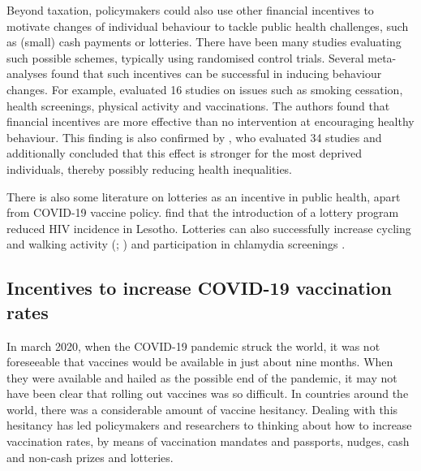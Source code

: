 \documentclass{scrbook}
\begin{document}
Beyond taxation, policymakers could also use other financial incentives
to motivate changes of individual behaviour to tackle public health
challenges, such as (small) cash payments or lotteries. There have been
many studies evaluating such possible schemes, typically using
randomised control trials. Several meta-analyses found that such
incentives can be successful in inducing behaviour changes. For example,
\textcite{giles_effectiveness_2014} evaluated 16 studies on issues such
as smoking cessation, health screenings, physical activity and
vaccinations. The authors found that financial incentives are more
effective than no intervention at encouraging healthy behaviour. This
finding is also confirmed by \textcite{mantzari_personal_2015}, who
evaluated 34 studies and additionally concluded that this effect is
stronger for the most deprived individuals, thereby possibly reducing
health inequalities.

There is also some literature on lotteries as an incentive in public
health, apart from COVID-19 vaccine policy.
\textcite{bjorkman_nyqvist_incentivizing_2018} find that the
introduction of a lottery program reduced HIV incidence in Lesotho.
Lotteries can also successfully increase cycling and walking activity
(\cite{ciccone_using_2021}; \cite{patel_randomized_2018}) and
participation in chlamydia screenings \parencite{niza_vouchers_2014}.

\subsection{Incentives to increase COVID-19 vaccination rates}

In march 2020, when the COVID-19 pandemic struck the world, it was not
foreseeable that vaccines would be available in just about nine months.
When they were available and hailed as the possible end of the pandemic,
it may not have been clear that rolling out vaccines was so difficult.
In countries around the world, there was a considerable amount of
vaccine hesitancy. Dealing with this hesitancy has led policymakers and
researchers to thinking about how to increase vaccination rates, by
means of vaccination mandates and passports, nudges, cash and non-cash
prizes and lotteries.
\end{document}
